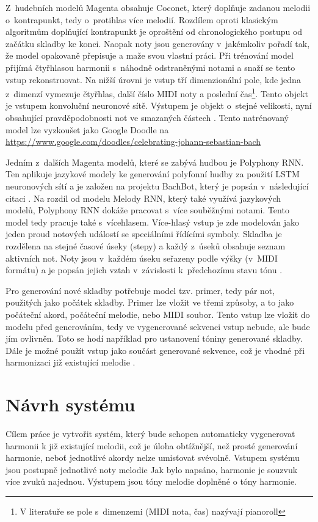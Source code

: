 Z~hudebních modelů Magenta obsahuje Coconet, 
který doplňuje zadanou melodii o~kontrapunkt, 
tedy o~protihlas více melodií\cite{kofron, huang2017counterpoint}.
Rozdílem oproti klasickým algoritmům doplňující kontrapunkt
je oproštění od chronologického postupu od začátku skladby ke konci.
Naopak noty jsou generovány v~jakémkoliv pořadí tak, 
že model opakovaně přepisuje a maže svou vlastní práci.
Při trénování model přijímá čtyřhlasou harmonii s~náhodně odstraněnými notami a snaží se tento vstup rekonstruovat.
Na nižší úrovni je vstup tří dimenzionální pole, 
kde jedna z~dimenzí vymezuje čtyřhlas, další číslo MIDI noty a poslední čas\footnote{V literatuře se pole s~dimenzemi (MIDI nota, čas) nazývají pianoroll}.
Tento objekt je vstupem konvoluční neuronové sítě.  
Výstupem je objekt o~stejné velikosti, 
nyní obsahující pravděpodobnosti not ve smazaných částech
\cite{huang2017counterpoint}.
Tento natrénovaný model lze vyzkoušet jako Google Doodle na \url{https://www.google.com/doodles/celebrating-johann-sebastian-bach}
\par
Jedním z~dalších Magenta modelů, které se zabývá hudbou je Polyphony RNN. 
Ten aplikuje jazykové modely ke generování polyfonní hudby za použití LSTM neuronových sítí
a je založen na projektu BachBot, který je popsán v~následující citaci \cite{Liang_AutomaticComposition}.
Na rozdíl od modelu Melody RNN, který také využívá jazykových modelů, 
Polyphony RNN dokáže pracovat s~více souběžnými notami.
Tento model tedy pracuje také s~vícehlasem.
Více-hlasý vstup je zde modelován jako jeden proud notových událostí se speciálními řídícími symboly.
Skladba je rozdělena na stejné časové úseky (stepy) 
a každý z~úseků obsahuje seznam aktivních not.
Noty jsou v~každém úseku seřazeny podle výšky (v~MIDI formátu) 
a je popsán jejich vztah v~závislosti k~předchozímu stavu tónu
\cite{google_git_polyphony}.

Pro generování nové skladby potřebuje model tzv. primer, tedy pár not, 
použitých jako počátek skladby. 
Primer lze vložit ve třemi způsoby, a to jako počáteční akord,
počáteční melodie, nebo MIDI soubor.
Tento vstup lze vložit do modelu před generováním,
tedy ve vygenerované sekvenci vstup nebude, ale bude jím ovlivněn.
Toto se hodí například pro ustanovení tóniny generované skladby.
Dále je možné použít vstup jako součást generované sekvence,
což je vhodné při harmonizaci již existující melodie
\cite{google_git_polyphony}.

\chapter{Návrh systému}
\label{navrhSystemu}
Cílem práce je vytvořit systém,
který bude schopen automaticky vygenerovat harmonii k již existující melodii,
což je úloha obtížnější, než prosté generování harmonie,
neboť jednotlivé akordy nelze umisťovat svévolně. 
Vstupem systému jsou postupně jednotlivé noty melodie
Jak bylo napsáno, harmonie je souzvuk více zvuků najednou.
Výstupem jsou tóny melodie doplněné o tóny harmonie.

